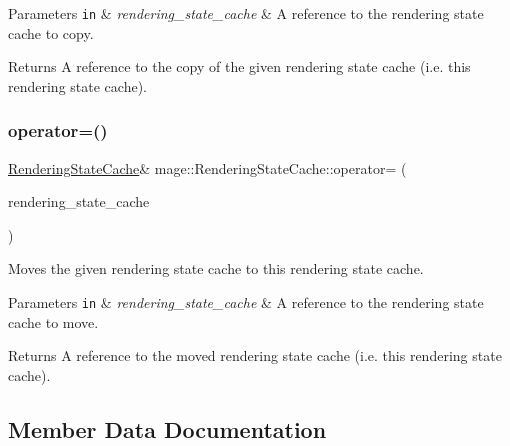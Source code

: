 \begin{DoxyParams}[1]{Parameters}
\mbox{\tt in}  & {\em rendering\+\_\+state\+\_\+cache} & A reference to the rendering state cache to copy. \\
\hline
\end{DoxyParams}
\begin{DoxyReturn}{Returns}
A reference to the copy of the given rendering state cache (i.\+e. this rendering state cache). 
\end{DoxyReturn}
\hypertarget{structmage_1_1_rendering_state_cache_aac885d9a83e196299ac896b3847f471b}{}\label{structmage_1_1_rendering_state_cache_aac885d9a83e196299ac896b3847f471b} 
\subsubsection{\texorpdfstring{operator=()}{operator=()}\hspace{0.1cm}{\footnotesize\ttfamily [2/2]}}
{\footnotesize\ttfamily \hyperlink{structmage_1_1_rendering_state_cache}{Rendering\+State\+Cache}\& mage\+::\+Rendering\+State\+Cache\+::operator= (\begin{DoxyParamCaption}\item[{\hyperlink{structmage_1_1_rendering_state_cache}{Rendering\+State\+Cache} \&\&}]{rendering\+\_\+state\+\_\+cache }\end{DoxyParamCaption})\hspace{0.3cm}{\ttfamily [delete]}}

Moves the given rendering state cache to this rendering state cache.


\begin{DoxyParams}[1]{Parameters}
\mbox{\tt in}  & {\em rendering\+\_\+state\+\_\+cache} & A reference to the rendering state cache to move. \\
\hline
\end{DoxyParams}
\begin{DoxyReturn}{Returns}
A reference to the moved rendering state cache (i.\+e. this rendering state cache). 
\end{DoxyReturn}


\subsection{Member Data Documentation}
\hypertarget{structmage_1_1_rendering_state_cache_ae29d186475c245d3eb5701005631c655}{}\label{structmage_1_1_rendering_state_cache_ae29d186475c245d3eb5701005631c655} 
